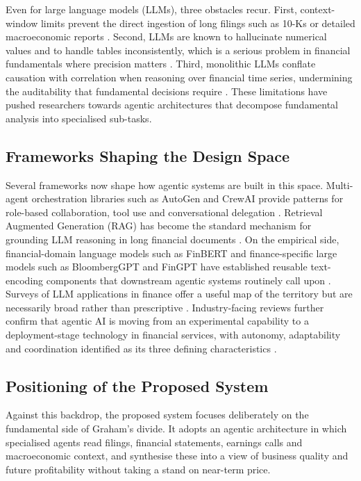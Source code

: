 Even for large language models (LLMs), three obstacles recur. First,
context-window limits prevent the direct ingestion of long filings
such as 10-Ks or detailed macroeconomic reports
\citep{Fatouros2025MarketSense}. Second, LLMs are known to hallucinate
numerical values and to handle tables inconsistently, which is a
serious problem in financial fundamentals where precision matters
\citep{saravanan2026}. Third, monolithic LLMs conflate causation
with correlation when reasoning over financial time series,
undermining the auditability that fundamental decisions require
\citep{saravanan2026}. These limitations have pushed researchers
towards agentic architectures that decompose fundamental analysis
into specialised sub-tasks.

\subsection{Frameworks Shaping the Design Space}
\label{sec:frameworks}

Several frameworks now shape how agentic systems are built in this
space. Multi-agent orchestration libraries such as AutoGen and
CrewAI provide patterns for role-based collaboration, tool use and
conversational delegation \citep{saravanan2026,setyowidodo2025}.
Retrieval Augmented Generation (RAG) has become the standard
mechanism for grounding LLM reasoning in long financial documents
\citep{han2024}. On the empirical side, financial-domain language
models such as FinBERT \citep{huang2023finbert} and finance-specific
large models such as BloombergGPT and FinGPT have established
reusable text-encoding components that downstream agentic systems
routinely call upon \citep{saravanan2026}. Surveys of LLM
applications in finance offer a useful map of the territory but are
necessarily broad rather than prescriptive \citep{liu2024}.
Industry-facing reviews further confirm that agentic AI is moving
from an experimental capability to a deployment-stage technology in
financial services, with autonomy, adaptability and coordination
identified as its three defining characteristics \citep{bhat2025}.

\subsection{Positioning of the Proposed System}
\label{sec:positioning}

Against this backdrop, the proposed system focuses deliberately on
the fundamental side of Graham's divide. It adopts an agentic
architecture in which specialised agents read filings, financial
statements, earnings calls and macroeconomic context, and synthesise
these into a view of business quality and future profitability without taking a stand on near-term price.

